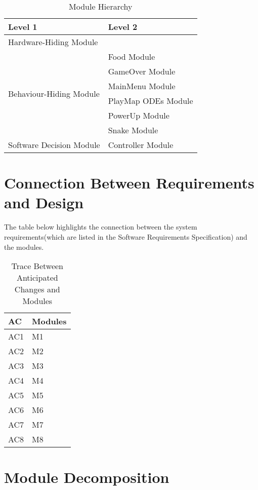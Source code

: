 \documentclass[12pt]{article}
\begin{document}
\begin{table}[h!]
\centering
\begin{tabular}{p{} p{}}
\toprule
\textbf{Level 1} & \textbf{Level 2}\\
\midrule

{Hardware-Hiding Module} & ~ \\
\midrule

\multirow{6}{0.3\textwidth}{Behaviour-Hiding Module} 
& Food Module\\
& GameOver Module\\
& MainMenu Module\\
& PlayMap ODEs Module\\
& PowerUp Module\\ 
& Snake Module\\
\midrule

\multirow{3}{0.3\textwidth}{Software Decision Module} 
& Controller Module\\
\bottomrule

\end{tabular}
\caption{Module Hierarchy}
\label{TblMH}
\end{table}

\section{Connection Between Requirements and Design} \label{SecConnection}

The table below highlights the connection between the system requirements(which are listed in the Software Requirements Specification) and the modules.

\begin{table}[H]
\centering
\begin{tabular}{p{} p{}}
\toprule
\textbf{AC} & \textbf{Modules}\\
\midrule
AC1 & M1\\
AC2 & M2\\
AC3 & M3\\
AC4 & M4\\
AC5 & M5\\
AC6 & M6\\
AC7 & M7\\
AC8 & M8\\
\bottomrule
\end{tabular}
\caption{Trace Between Anticipated Changes and Modules}
\end{table}

\section{Module Decomposition} \label{SecMD}
\end{document}

